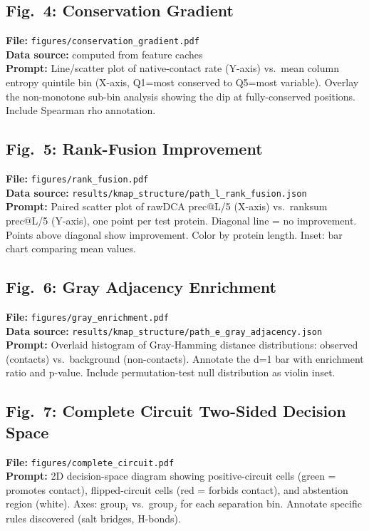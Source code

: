\subsection*{Fig.~4: Conservation Gradient}
\textbf{File:} \texttt{figures/conservation\_gradient.pdf}\\
\textbf{Data source:} computed from feature caches\\
\textbf{Prompt:} Line/scatter plot of native-contact rate (Y-axis) vs.\
mean column entropy quintile bin (X-axis, Q1=most conserved to Q5=most
variable).  Overlay the non-monotone sub-bin analysis showing the dip at
fully-conserved positions.  Include Spearman rho annotation.

\subsection*{Fig.~5: Rank-Fusion Improvement}
\textbf{File:} \texttt{figures/rank\_fusion.pdf}\\
\textbf{Data source:} \texttt{results/kmap\_structure/path\_l\_rank\_fusion.json}\\
\textbf{Prompt:} Paired scatter plot of rawDCA prec@L/5 (X-axis) vs.\
ranksum prec@L/5 (Y-axis), one point per test protein.  Diagonal line =
no improvement.  Points above diagonal show improvement.  Color by protein
length.  Inset: bar chart comparing mean values.

\subsection*{Fig.~6: Gray Adjacency Enrichment}
\textbf{File:} \texttt{figures/gray\_enrichment.pdf}\\
\textbf{Data source:} \texttt{results/kmap\_structure/path\_e\_gray\_adjacency.json}\\
\textbf{Prompt:} Overlaid histogram of Gray-Hamming distance distributions:
observed (contacts) vs.\ background (non-contacts).  Annotate the d=1 bar
with enrichment ratio and p-value.  Include permutation-test null distribution
as violin inset.

\subsection*{Fig.~7: Complete Circuit Two-Sided Decision Space}
\textbf{File:} \texttt{figures/complete\_circuit.pdf}\\
\textbf{Prompt:} 2D decision-space diagram showing positive-circuit cells
(green = promotes contact), flipped-circuit cells (red = forbids contact),
and abstention region (white).  Axes: group$_i$ vs.\ group$_j$ for each
separation bin.  Annotate specific rules discovered (salt bridges, H-bonds).


